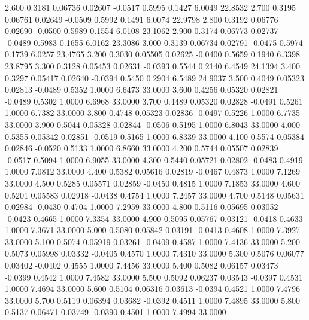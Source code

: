    2.600   0.3181   0.06736   0.02607  -0.0517   0.5995   0.1427   6.0049  22.8532
   2.700   0.3195   0.06761   0.02649  -0.0509   0.5992   0.1491   6.0074  22.9798
   2.800   0.3192   0.06776   0.02690  -0.0500   0.5989   0.1554   6.0108  23.1062
   2.900   0.3174   0.06773   0.02737  -0.0489   0.5983   0.1655   6.0162  23.3086
   3.000   0.3139   0.06734   0.02791  -0.0475   0.5974   0.1739   6.0257  23.4765
   3.200   0.3030   0.05505   0.02625  -0.0400   0.5659   0.1940   6.3398  23.8795
   3.300   0.3128   0.05453   0.02631  -0.0393   0.5544   0.2140   6.4549  24.1394
   3.400   0.3297   0.05417   0.02640  -0.0394   0.5450   0.2904   6.5489  24.9037
   3.500   0.4049   0.05323   0.02813  -0.0489   0.5352   1.0000   6.6473  33.0000
   3.600   0.4256   0.05320   0.02821  -0.0489   0.5302   1.0000   6.6968  33.0000
   3.700   0.4489   0.05320   0.02828  -0.0491   0.5261   1.0000   6.7382  33.0000
   3.800   0.4748   0.05323   0.02836  -0.0497   0.5226   1.0000   6.7735  33.0000
   3.900   0.5044   0.05328   0.02844  -0.0506   0.5195   1.0000   6.8043  33.0000
   4.000   0.5355   0.05342   0.02851  -0.0519   0.5165   1.0000   6.8339  33.0000
   4.100   0.5574   0.05384   0.02846  -0.0520   0.5133   1.0000   6.8660  33.0000
   4.200   0.5744   0.05507   0.02839  -0.0517   0.5094   1.0000   6.9055  33.0000
   4.300   0.5440   0.05721   0.02802  -0.0483   0.4919   1.0000   7.0812  33.0000
   4.400   0.5382   0.05616   0.02819  -0.0467   0.4873   1.0000   7.1269  33.0000
   4.500   0.5285   0.05571   0.02859  -0.0450   0.4815   1.0000   7.1853  33.0000
   4.600   0.5201   0.05583   0.02918  -0.0438   0.4754   1.0000   7.2457  33.0000
   4.700   0.5148   0.05631   0.02984  -0.0430   0.4704   1.0000   7.2959  33.0000
   4.800   0.5116   0.05695   0.03052  -0.0423   0.4665   1.0000   7.3354  33.0000
   4.900   0.5095   0.05767   0.03121  -0.0418   0.4633   1.0000   7.3671  33.0000
   5.000   0.5080   0.05842   0.03191  -0.0413   0.4608   1.0000   7.3927  33.0000
   5.100   0.5074   0.05919   0.03261  -0.0409   0.4587   1.0000   7.4136  33.0000
   5.200   0.5073   0.05998   0.03332  -0.0405   0.4570   1.0000   7.4310  33.0000
   5.300   0.5076   0.06077   0.03402  -0.0402   0.4555   1.0000   7.4456  33.0000
   5.400   0.5082   0.06157   0.03473  -0.0399   0.4542   1.0000   7.4582  33.0000
   5.500   0.5092   0.06237   0.03543  -0.0397   0.4531   1.0000   7.4694  33.0000
   5.600   0.5104   0.06316   0.03613  -0.0394   0.4521   1.0000   7.4796  33.0000
   5.700   0.5119   0.06394   0.03682  -0.0392   0.4511   1.0000   7.4895  33.0000
   5.800   0.5137   0.06471   0.03749  -0.0390   0.4501   1.0000   7.4994  33.0000
